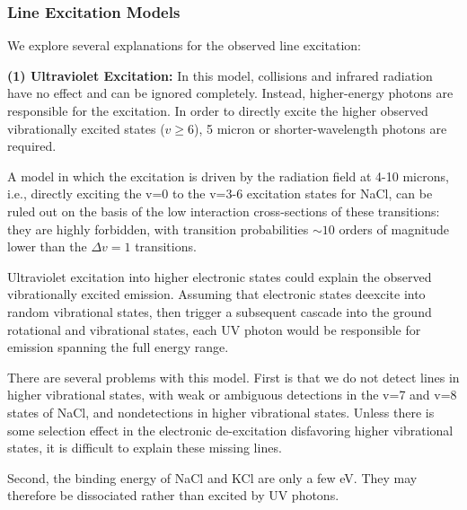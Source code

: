 \documentclass[twocolumn]{aastex62}
\begin{document}

\subsubsection{Line Excitation Models}
We explore several explanations for the observed line excitation:

\par{\textbf{(1) Ultraviolet Excitation:}}
In this model, collisions and infrared radiation have no effect and can be
ignored completely.  Instead, higher-energy photons are responsible for the
excitation.  In order to directly excite the higher observed vibrationally
excited states ($v\geq6$), 5 micron or shorter-wavelength photons are required.

A model in which the excitation is driven by the radiation field at 4-10 microns,
i.e., directly exciting the v=0 to the v=3-6 excitation states for NaCl,
can be ruled out on the basis of the low interaction cross-sections of these
transitions: they are highly forbidden, with transition probabilities $\sim10$
orders of magnitude lower than the $\Delta v=1$ transitions.

Ultraviolet excitation into higher electronic states could explain the observed
vibrationally excited emission.  Assuming that electronic states deexcite into
random vibrational states, then trigger a subsequent cascade into the ground
rotational and vibrational states, each UV photon would be responsible for emission
spanning the full energy range.

There are several problems with this model.  First is that we do not detect lines
in higher vibrational states, with weak or ambiguous detections in the v=7 and v=8 
states of NaCl, and nondetections in higher vibrational states.  Unless there is
some selection effect in the electronic de-excitation disfavoring higher vibrational
states, it is difficult to explain these missing lines.  

Second, the binding energy of NaCl and KCl are only a few eV.  They may therefore
be dissociated rather than excited by UV photons.
\end{document}

